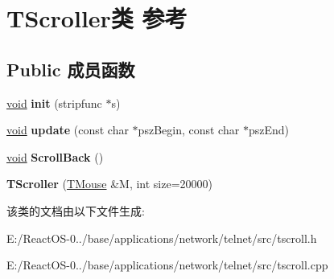 \hypertarget{class_t_scroller}{}\section{T\+Scroller类 参考}
\label{class_t_scroller}
\subsection*{Public 成员函数}
\begin{DoxyCompactItemize}
\item 
\mbox{\label{class_t_scroller_a6d0d819880e37ac7e3c27be0627ea262}} 
\hyperlink{interfacevoid}{void} {\bfseries init} (stripfunc $\ast$s)
\item 
\mbox{\label{class_t_scroller_a76ca334b317aee0b394b10bb2b425b49}} 
\hyperlink{interfacevoid}{void} {\bfseries update} (const char $\ast$psz\+Begin, const char $\ast$psz\+End)
\item 
\mbox{\label{class_t_scroller_a0337b1714db53c8a22d58bc4d8826496}} 
\hyperlink{interfacevoid}{void} {\bfseries Scroll\+Back} ()
\item 
\mbox{\label{class_t_scroller_a02393b685cdd6bafcc73ea3fa10c15bf}} 
{\bfseries T\+Scroller} (\hyperlink{class_t_mouse}{T\+Mouse} \&M, int size=20000)
\end{DoxyCompactItemize}


该类的文档由以下文件生成\+:\begin{DoxyCompactItemize}
\item 
E\+:/\+React\+O\+S-\/0../base/applications/network/telnet/src/tscroll.\+h\item 
E\+:/\+React\+O\+S-\/0../base/applications/network/telnet/src/tscroll.\+cpp\end{DoxyCompactItemize}
